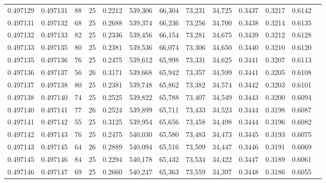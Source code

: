 \begin{tabular}{rrrrrrrrrrrrr}
0.497129 & 0.497131 &    88 &  25 &                                     0.2212 & 539,306 &  66,304 &  73,231 &  34,725 & 0.3437 & 0.3217 & 0.6142 \\
0.497131 & 0.497132 &    68 &  25 &                                     0.2688 & 539,374 &  66,236 &  73,256 &  34,700 & 0.3438 & 0.3214 & 0.6135 \\
0.497132 & 0.497133 &    82 &  25 &                                     0.2336 & 539,456 &  66,154 &  73,281 &  34,675 & 0.3439 & 0.3212 & 0.6128 \\
0.497133 & 0.497135 &    80 &  25 &                                     0.2381 & 539,536 &  66,074 &  73,306 &  34,650 & 0.3440 & 0.3210 & 0.6120 \\
0.497135 & 0.497136 &    76 &  25 &                                     0.2475 & 539,612 &  65,998 &  73,331 &  34,625 & 0.3441 & 0.3207 & 0.6113 \\
0.497136 & 0.497137 &    56 &  26 &                                     0.3171 & 539,668 &  65,942 &  73,357 &  34,599 & 0.3441 & 0.3205 & 0.6108 \\
0.497137 & 0.497138 &    80 &  25 &                                     0.2381 & 539,748 &  65,862 &  73,382 &  34,574 & 0.3442 & 0.3203 & 0.6101 \\
0.497138 & 0.497140 &    74 &  25 &                                     0.2525 & 539,822 &  65,788 &  73,407 &  34,549 & 0.3443 & 0.3200 & 0.6094 \\
0.497140 & 0.497141 &    77 &  26 &                                     0.2524 & 539,899 &  65,711 &  73,433 &  34,523 & 0.3444 & 0.3198 & 0.6087 \\
0.497141 & 0.497142 &    55 &  25 &                                     0.3125 & 539,954 &  65,656 &  73,458 &  34,498 & 0.3444 & 0.3196 & 0.6082 \\
0.497142 & 0.497143 &    76 &  25 &                                     0.2475 & 540,030 &  65,580 &  73,483 &  34,473 & 0.3445 & 0.3193 & 0.6075 \\
0.497143 & 0.497145 &    64 &  26 &                                     0.2889 & 540,094 &  65,516 &  73,509 &  34,447 & 0.3446 & 0.3191 & 0.6069 \\
0.497145 & 0.497146 &    84 &  25 &                                     0.2294 & 540,178 &  65,432 &  73,534 &  34,422 & 0.3447 & 0.3189 & 0.6061 \\
0.497146 & 0.497147 &    69 &  25 &                                     0.2660 & 540,247 &  65,363 &  73,559 &  34,397 & 0.3448 & 0.3186 & 0.6055 \\

\end{tabular}
